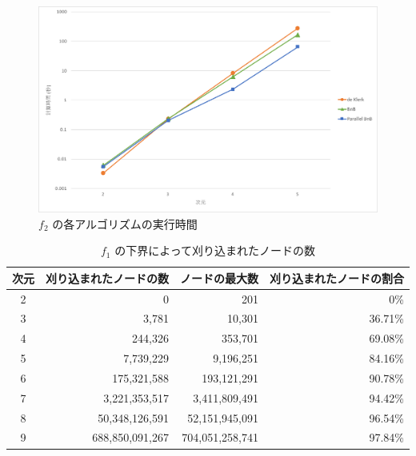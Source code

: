 \documentclass[a4paper,11pt]{jreport}
\begin{document}
\begin{figure}[h]
\begin{center}
\includegraphics[width=14cm]{graphs/f_2_time.pdf}
\caption{$ f_2 $ の各アルゴリズムの実行時間}
\label{fig:f_2_time}
\end{center}
\end{figure}

\newpage

\begin{table}[h]
\caption{$ f_1 $ の下界によって刈り込まれたノードの数}
\label{tbl:f_1_eliminated}
\begin{center}
\begin{tabular}{|c|r|r|r|} \hline
次元 & 刈り込まれたノードの数 & ノードの最大数 & 刈り込まれたノードの割合 \\ \hline
2 & 0 & 201 & 0\% \\
3 & 3,781 & 10,301 & 36.71\% \\
4 & 244,326 & 353,701 & 69.08\% \\
5 & 7,739,229 & 9,196,251 & 84.16\% \\
6 & 175,321,588 & 193,121,291 & 90.78\% \\
7 & 3,221,353,517 & 3,411,809,491 & 94.42\% \\
8 & 50,348,126,591 & 52,151,945,091 & 96.54\% \\ 
9 & 688,850,091,267 & 704,051,258,741 & 97.84\% \\ \hline
\end{tabular}
\end{center}
\end{table}
\end{document}
